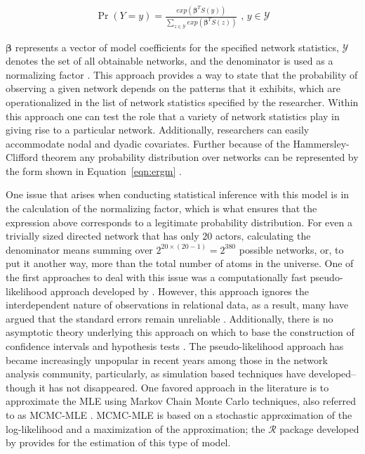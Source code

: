 \begin{align}
\Pr(Y = y) = \frac{ exp( \bm\beta^{T} S(y)  )  }{ \sum_{z \in \mathcal{Y}} exp( \bm\beta^{T} S(z)  )  } \text{ ,  } y \in \mathcal{Y}
\label{eqn:ergm}
\end{align}

$\bm\beta$ represents a vector of model coefficients for the specified network statistics, $\mathcal{Y}$ denotes the set of all obtainable networks, and the denominator is used as a normalizing factor \citep{hunter:etal:2008}. This approach provides a way to state that the probability of observing a given network depends on the patterns that it exhibits, which are operationalized in the list of network statistics specified by the researcher. Within this approach one can test the role that a variety of network statistics play in giving rise to a particular network. Additionally, researchers can easily accommodate nodal and dyadic covariates. Further because of the Hammersley-Clifford theorem any probability distribution over networks can be represented by the form shown in Equation~\ref{eqn:ergm} \citep{hammersley:clifford:1971}. 

One issue that arises when conducting statistical inference with this model is in the calculation of the normalizing factor, which is what ensures that the expression above corresponds to a legitimate probability distribution. For even a trivially sized directed network that has only $20$ actors, calculating the denominator means summing over $2^{20\times(20-1)} = 2^{380}$ possible networks, or, to put it another way, more than the total number of atoms in the universe. One of the first approaches to deal with this issue was a computationally fast pseudo-likelihood approach developed by \citet{strauss:ikeda:1990}. However, this approach ignores the interdependent nature of observations in relational data, as a result, many have argued that the standard errors remain unreliable \citep{lubbers:snijders:2007,robins:etal:2007a,vanduijn:etal:2009}. Additionally, there is no asymptotic theory underlying this approach on which to base the construction of confidence intervals and hypothesis tests \citep{kolaczyk:2009}. The pseudo-likelihood approach has became increasingly unpopular in recent years among those in the network analysis community, particularly, as simulation based techniques have developed--though it has not disappeared. One favored approach in the literature is to approximate the MLE using Markov Chain Monte Carlo techniques, also referred to as MCMC-MLE \citep{geyer:thompson:1992,snijders:2002,handcock:2003b}. MCMC-MLE is based on a stochastic approximation of the log-likelihood and a maximization of the approximation; the  $\mathcal{R}$ package developed by \citet{hunter:etal:2008} provides for the estimation of this type of model.

